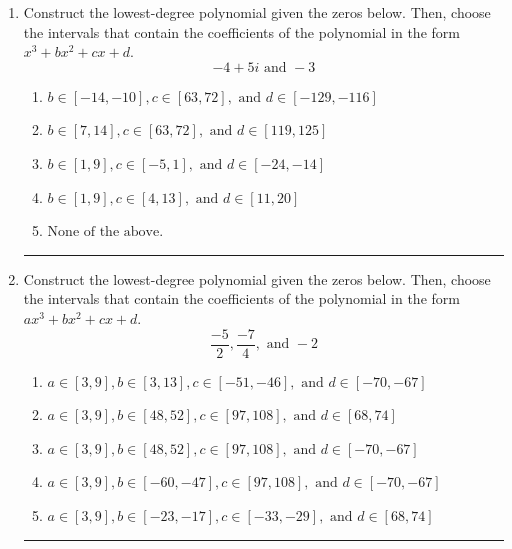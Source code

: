 \documentclass[14pt]{extbook}
\newcommand{\litem}[1]{\item#1\hspace*{-1cm}\rule{\textwidth}{0.4pt}}
\begin{document}
\begin{enumerate}
\litem{
Construct the lowest-degree polynomial given the zeros below. Then, choose the intervals that contain the coefficients of the polynomial in the form $x^3+bx^2+cx+d$.\[ -4 + 5 i \text{ and } -3 \]\begin{enumerate}[label=\Alph*.]
\item \( b \in [-14, -10], c \in [63, 72], \text{ and } d \in [-129, -116] \)
\item \( b \in [7, 14], c \in [63, 72], \text{ and } d \in [119, 125] \)
\item \( b \in [1, 9], c \in [-5, 1], \text{ and } d \in [-24, -14] \)
\item \( b \in [1, 9], c \in [4, 13], \text{ and } d \in [11, 20] \)
\item \( \text{None of the above.} \)

\end{enumerate} }
\litem{
Construct the lowest-degree polynomial given the zeros below. Then, choose the intervals that contain the coefficients of the polynomial in the form $ax^3+bx^2+cx+d$.\[ \frac{-5}{2}, \frac{-7}{4}, \text{ and } -2 \]\begin{enumerate}[label=\Alph*.]
\item \( a \in [3, 9], b \in [3, 13], c \in [-51, -46], \text{ and } d \in [-70, -67] \)
\item \( a \in [3, 9], b \in [48, 52], c \in [97, 108], \text{ and } d \in [68, 74] \)
\item \( a \in [3, 9], b \in [48, 52], c \in [97, 108], \text{ and } d \in [-70, -67] \)
\item \( a \in [3, 9], b \in [-60, -47], c \in [97, 108], \text{ and } d \in [-70, -67] \)
\item \( a \in [3, 9], b \in [-23, -17], c \in [-33, -29], \text{ and } d \in [68, 74] \)


\end{enumerate}}
\end{enumerate}
\end{document}
